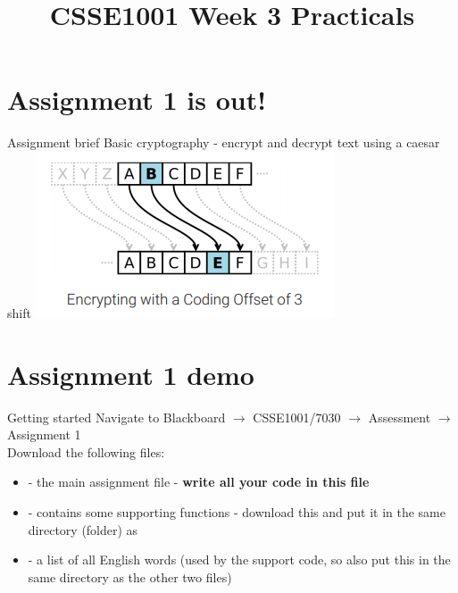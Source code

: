 \documentclass[week3]{csse1001}
\title{CSSE1001 Week 3 Practicals}
\begin{document}
\begin{frame} 
\maketitle
\end{frame}

\section{Assignment 1 is out!}

\begin{topic}{Assignment brief}
Basic cryptography - encrypt and decrypt text using a caesar shift
\includegraphics[scale=1]{encryption}
\end{topic}

\section{Assignment 1 demo}

\begin{topic}{Getting started}
Navigate to Blackboard $\to$ CSSE1001/7030 $\to$ Assessment $\to$ Assignment 1\\

Download the following files:
\begin{itemize}
\item {} - the main assignment file - \textbf{write all your code in this file}
\item {} - contains some supporting functions - download this and put it in the same directory (folder) as 
\item {} - a list of all English words (used by the support code, so also put this in the same directory as the other two files)
\end{itemize}

\end{topic}
\end{document}
